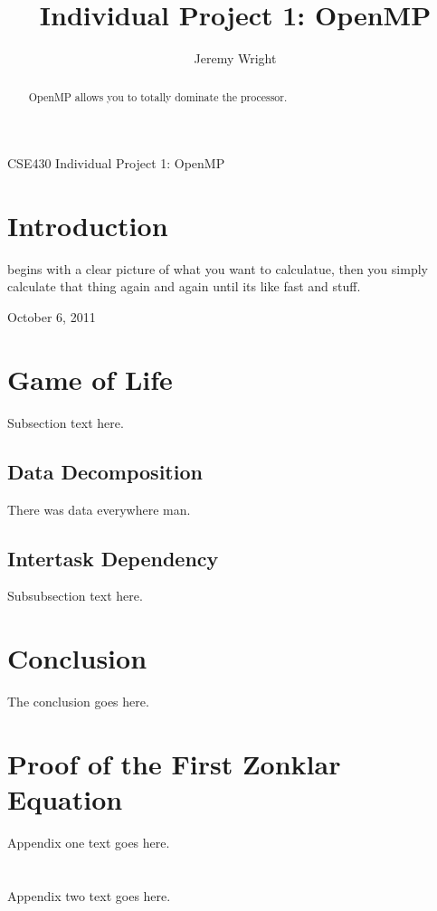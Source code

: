 \documentclass[journal]{IEEEtran}
\begin{document}
%
\title{Individual Project 1: OpenMP}
%

\author{Jeremy Wright}

{CSE430 Individual Project 1: OpenMP}

\maketitle


\begin{abstract}
OpenMP allows you to totally dominate the processor.
\end{abstract}

\IEEEpeerreviewmaketitle



\section{Introduction}

 begins with a clear picture of what you want to calculatue, then you 
simply calculate that thing again and again until its like fast and stuff.


\hfill October 6, 2011

\section{Game of Life}
Subsection text here.

\subsection{Data Decomposition}
There was data everywhere man.
\subsection{Intertask Dependency}
Subsubsection text here.


\section{Conclusion}
The conclusion goes here.




\appendices
\section{Proof of the First Zonklar Equation}
Appendix one text goes here.

\section{}
Appendix two text goes here.

\end{document}
